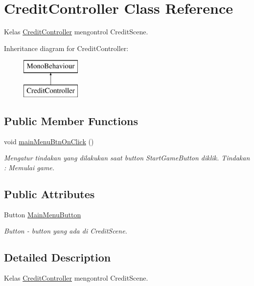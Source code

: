 \hypertarget{class_credit_controller}{}\section{Credit\+Controller Class Reference}
\label{class_credit_controller}


Kelas \hyperlink{class_credit_controller}{Credit\+Controller} mengontrol Credit\+Scene.  


Inheritance diagram for Credit\+Controller\+:\begin{figure}[H]
\begin{center}
\leavevmode
\includegraphics[height=2.000000cm]{class_credit_controller}
\end{center}
\end{figure}
\subsection*{Public Member Functions}
\begin{DoxyCompactItemize}
\item 
void \hyperlink{class_credit_controller_ad486d59710cfdbb207f0c4835143f86d}{main\+Menu\+Btn\+On\+Click} ()
\begin{DoxyCompactList}\small\item\em Mengatur tindakan yang dilakukan saat button Start\+Game\+Button diklik. Tindakan \+: Memulai game. \end{DoxyCompactList}\end{DoxyCompactItemize}
\subsection*{Public Attributes}
\begin{DoxyCompactItemize}
\item 
Button \hyperlink{class_credit_controller_a8b122365e9edd7291df09824506f726d}{Main\+Menu\+Button}
\begin{DoxyCompactList}\small\item\em Button -\/ button yang ada di Credit\+Scene. \end{DoxyCompactList}\end{DoxyCompactItemize}


\subsection{Detailed Description}
Kelas \hyperlink{class_credit_controller}{Credit\+Controller} mengontrol Credit\+Scene. 



